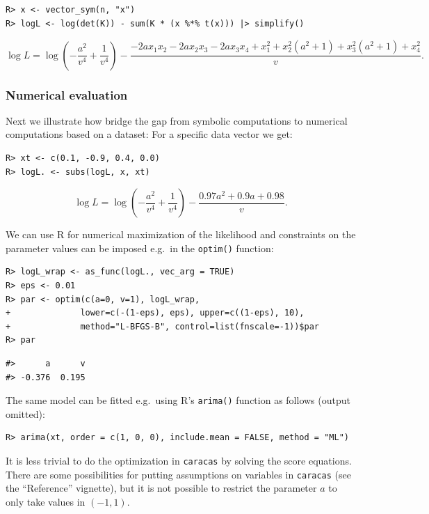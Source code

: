\begin{verbatim}
R> x <- vector_sym(n, "x")
R> logL <- log(det(K)) - sum(K * (x %*% t(x))) |> simplify()
\end{verbatim}

\[
\log L = \log{\left(- \frac{a^{2}}{v^{4}} + \frac{1}{v^{4}} \right)} - \frac{- 2 a x_{1} x_{2} - 2 a x_{2} x_{3} - 2 a x_{3} x_{4} + x_{1}^{2} + x_{2}^{2} \left(a^{2} + 1\right) + x_{3}^{2} \left(a^{2} + 1\right) + x_{4}^{2}}{v} .
\]

\hypertarget{numerical-evaluation}{%
\subsubsection{Numerical evaluation}\label{numerical-evaluation}}

Next we illustrate how bridge the gap from symbolic computations to numerical computations based on a dataset:
For a specific data vector we get:

\begin{verbatim}
R> xt <- c(0.1, -0.9, 0.4, 0.0)
R> logL. <- subs(logL, x, xt) 
\end{verbatim}

\[
\log L = \log{\left(- \frac{a^{2}}{v^{4}} + \frac{1}{v^{4}} \right)} - \frac{0.97 a^{2} + 0.9 a + 0.98}{v} .
\]

We can use R for numerical maximization of the likelihood and constraints on the
parameter values can be imposed e.g.~in the \texttt{optim()} function:

\begin{verbatim}
R> logL_wrap <- as_func(logL., vec_arg = TRUE)
R> eps <- 0.01
R> par <- optim(c(a=0, v=1), logL_wrap, 
+              lower=c(-(1-eps), eps), upper=c((1-eps), 10),
+              method="L-BFGS-B", control=list(fnscale=-1))$par
R> par
\end{verbatim}

\begin{verbatim}
#>      a      v 
#> -0.376  0.195
\end{verbatim}

The same model can be fitted e.g.~using R's \texttt{arima()} function as follows (output omitted):

\begin{verbatim}
R> arima(xt, order = c(1, 0, 0), include.mean = FALSE, method = "ML")
\end{verbatim}

It is less trivial to do the optimization in \texttt{caracas} by solving the score equations.
There are some possibilities for putting assumptions on variables
in \texttt{caracas} (see the ``Reference'' vignette), but
it is not possible to restrict the parameter \(a\) to only take values in \((-1, 1)\).

